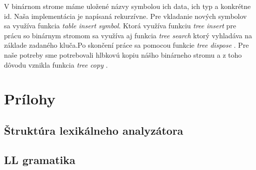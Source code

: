 \documentclass[12pt]{article}
\begin{document}
				V binárnom strome máme uložené názvy symbolou ich data, ich typ a konkrétne id. Naša implementácia je napísaná rekurzívne. Pre vkladanie nových symbolov sa využíva funkcia \textit{table insert symbol}. Ktorá využíva funkciu \textit{tree insert} pre prácu so binárnym stromom sa využíva aj funkcia \textit{tree search} ktorý vyhladáva na základe zadaného kluča.Po skončení práce sa pomocou funkcie \textit{tree dispose} . Pre naše potreby sme potrebovali hlbkovú kopiu nášho binárneho stromu a z toho dôvodu vznikla funkcia \textit{tree copy} .
	\section{Prílohy}
		\subsection{Štruktúra lexikálneho analyzátora}
		\subsection{LL gramatika}
\end{document}
